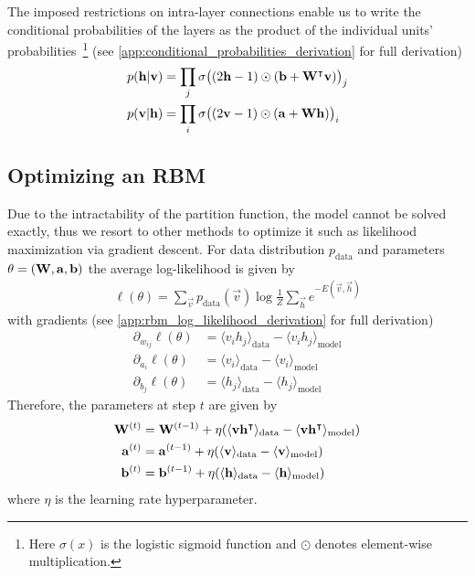 The imposed restrictions on intra-layer connections enable us to write the conditional probabilities of the layers as the product of the individual units' probabilities~\footnote{Here \( \sigma(x) \) is the logistic sigmoid function and \( \odot \) denotes element-wise multiplication.} (see \cref{app:conditional_probabilities_derivation} for full derivation)
\begin{align}
    p(\mathbf{h} | \mathbf{v})
        &= \prod_j \sigma\big( (2\mathbf{h} - 1) \odot (\mathbf{b} + \mathbf{W}^\intercal\mathbf{v}) \big)_j \\
    p(\mathbf{v} | \mathbf{h})
        &= \prod_i \sigma\big( (2\mathbf{v} - 1) \odot (\mathbf{a} + \mathbf{W}\mathbf{h}) \big)_i
\end{align}

\subsection{Optimizing an RBM}
Due to the intractability of the partition function, the model cannot be solved exactly, thus we resort to other methods to optimize it such as likelihood maximization via gradient descent.
For data distribution \( p_\text{data} \) and parameters \( \theta = (\mathbf{W}, \mathbf{a}, \mathbf{b}) \) the average log-likelihood is given by
\begin{align}
    \ell(\theta) = \sum_{\vec{v}} p_{\text{data}}(\vec{v}) \log \frac{1}{Z} \sum_\vec{h} e^{-E(\vec{v},\vec{h})}
\end{align}
with gradients (see \cref{app:rbm_log_likelihood_derivation} for full derivation)
\begin{align}
    \partial_{w_{ij}} \ell(\theta)
        &= \langle v_i h_j \rangle_{\text{data}} - \langle v_i h_j \rangle_{\text{model}} \\
    \partial_{a_i} \ell(\theta)
        &= \langle v_i \rangle_{\text{data}} - \langle v_i \rangle_{\text{model}} \\
    \partial_{b_j} \ell(\theta)
        &= \langle h_j \rangle_{\text{data}} - \langle h_j \rangle_{\text{model}}
\end{align}
Therefore, the parameters at step \( t \) are given by
\begin{align}
    \mathbf{W}^{(t)}
        &= \mathbf{W}^{(t-1)} + \eta(\langle \mathbf{v} \mathbf{h}^\intercal \rangle_{\text{data}} - \langle \mathbf{v} \mathbf{h}^\intercal \rangle_{\text{model}}) \\
    \mathbf{a}^{(t)}
        &= \mathbf{a}^{(t-1)} + \eta(\langle \mathbf{v} \rangle_{\text{data}} - \langle \mathbf{v} \rangle_{\text{model}}) \\
    \mathbf{b}^{(t)}
        &= \mathbf{b}^{(t-1)} + \eta(\langle \mathbf{h} \rangle_{\text{data}} - \langle \mathbf{h} \rangle_{\text{model}})
\end{align}
where \( \eta \) is the learning rate hyperparameter.

